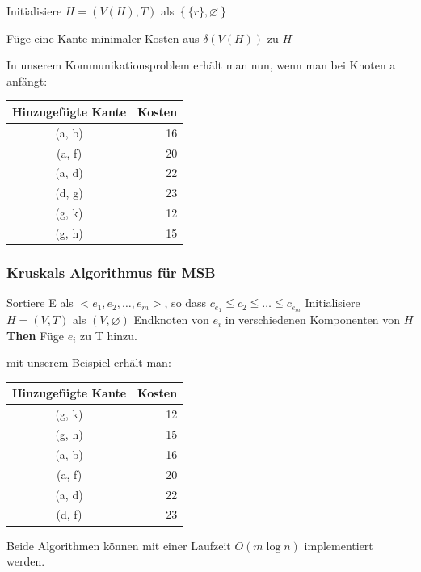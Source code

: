 \begin{algorithmic}
\STATE Initialisiere $H=\left(V(H),T\right)$ als $\left\{\{r\},
\varnothing\right\}$

\STATE Füge eine Kante minimaler Kosten aus $\delta\left(V(H)\right)$ zu $H$
\ENDWHILE
\end{algorithmic}

In unserem Kommunikationsproblem erhält man nun, wenn man bei Knoten a 
anfängt:

\begin{tabular}{|c|r|}
\hline
{\bf Hinzugefügte Kante}& {\bf Kosten}\\
\hline
(a, b)& 16\\
\hline
(a, f)& 20\\
\hline
(a, d)&22\\
\hline
(d, g)&23\\
\hline
(g, k)&12\\
\hline
(g, h)&15\\
\hline
\end{tabular}

\subsubsection{Kruskals Algorithmus für MSB}

\begin{algorithmic}
\STATE Sortiere E als $<e_{1}, e_{2}, \ldots, e_{m}>$, so dass $c_{e_{1}} \leqq
c_{2} \leqq \ldots \leqq c_{e_{m}}$
\STATE Initialisiere $H=(V,T)$ als $(V, \varnothing)$
 Endknoten von $e_{i}$ in verschiedenen Komponenten von $H$
{\bf Then} Füge
$e_{i}$ zu T hinzu.
\ENDFOR
\end{algorithmic}


mit unserem Beispiel erhält man:

\begin{tabular}{|c|r|}
\hline
{\bf Hinzugefügte Kante}& {\bf Kosten}\\
\hline
(g, k)& 12\\
\hline
(g, h)& 15\\
\hline
(a, b)&16\\
\hline
(a, f)&20\\
\hline
(a, d)&22\\
\hline
(d, f)&23\\
\hline
\end{tabular}

Beide Algorithmen können mit einer Laufzeit $O(m \log n)$ implementiert
werden.

